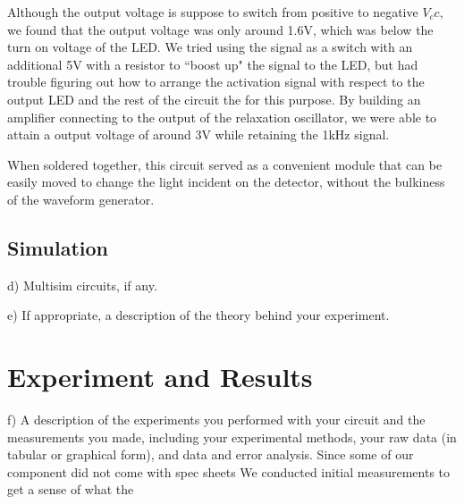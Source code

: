 \documentclass[authoryear, 12pt,5p, times]{elsarticle}
\begin{document}
\par Although the output voltage is suppose to switch from positive to negative $V_cc$, we found that the output voltage was only around 1.6V, which was below the turn on voltage of the LED. We tried using the signal as a switch with an additional 5V with a resistor to ``boost up" the signal to the LED, but had trouble figuring out how to arrange the activation signal with respect to the output LED and the rest of the circuit the for this purpose. By building an amplifier connecting to the output of the relaxation oscillator, we were able to attain a output voltage of around 3V while retaining the 1kHz signal.
\par When soldered together, this circuit served as a convenient module that can be easily moved to change the light incident on the detector, without the bulkiness of the waveform generator.
\subsection{Simulation}
d)              Multisim circuits, if any.

e)               If appropriate, a description of the theory behind your experiment.
\section{Experiment and Results}
f)                A description of the experiments you performed with your circuit and the measurements you made, including your experimental methods, your raw data (in tabular or graphical form), and data and error analysis.
Since some of our component did not come with spec sheets We conducted initial measurements to get a sense of what the 
\end{document}
